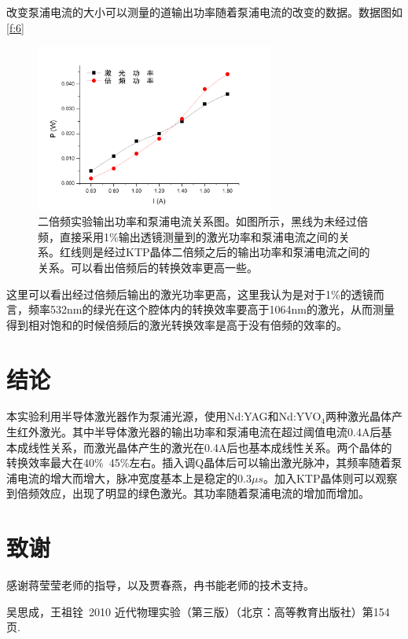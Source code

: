 \documentclass[aps,pre,12pt,preprint,onecolumn,showpacs,showkeys,UTF8]{revtex4-1}
\begin{document}
改变泵浦电流的大小可以测量的道输出功率随着泵浦电流的改变的数据。数据图如\ref{f:6}

\begin{figure}[h]
	\begin{center}
		\includegraphics[width=0.7\textwidth]{pic7.png}
		\caption{\label{g:4}二倍频实验输出功率和泵浦电流关系图。如图所示，黑线为未经过倍频，直接采用1\%输出透镜测量到的激光功率和泵浦电流之间的关系。红线则是经过KTP晶体二倍频之后的输出功率和泵浦电流之间的关系。可以看出倍频后的转换效率更高一些。}
	\end{center}
\end{figure}

这里可以看出经过倍频后输出的激光功率更高，这里我认为是对于1\%的透镜而言，频率532nm的绿光在这个腔体内的转换效率要高于1064nm的激光，从而测量得到相对饱和的时候倍频后的激光转换效率是高于没有倍频的效率的。


\section{结论}
本实验利用半导体激光器作为泵浦光源，使用Nd:YAG和Nd:YVO$_4$两种激光晶体产生红外激光。其中半导体激光器的输出功率和泵浦电流在超过阈值电流0.4A后基本成线性关系，而激光晶体产生的激光在0.4A后也基本成线性关系。两个晶体的转换效率最大在40\%~45\%左右。插入调Q晶体后可以输出激光脉冲，其频率随着泵浦电流的增大而增大，脉冲宽度基本上是稳定的0.3$\mu s$。加入KTP晶体则可以观察到倍频效应，出现了明显的绿色激光。其功率随着泵浦电流的增加而增加。

\section{致谢} 
感谢蒋莹莹老师的指导，以及贾春燕，冉书能老师的技术支持。


\begin{thebibliography}{}
	 吴思成，王祖铨~2010 近代物理实验（第三版）（北京：高等教育出版社）第154页.%
%
\end{thebibliography}
\end{document}
